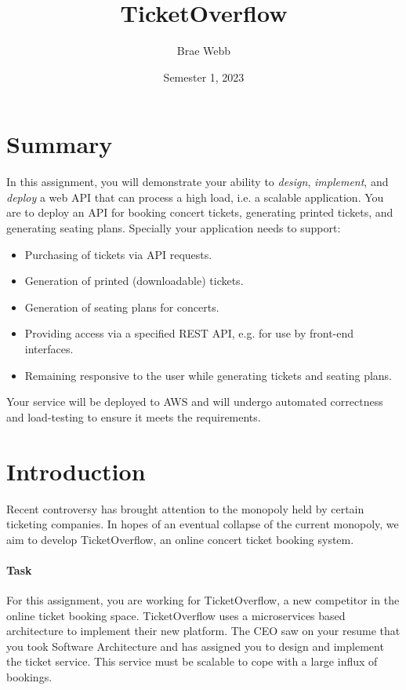 \documentclass{csse4400}
\title{TicketOverflow}
\author{Brae Webb}
\date{Semester 1, 2023}
\begin{document}
\maketitle

\section*{Summary}
In this assignment, you will demonstrate your ability to \textsl{design},
\textsl{implement}, and \textsl{deploy} a web API that can process a high load,
i.e. a scalable application.
You are to deploy an API for booking concert tickets,
generating printed tickets, and generating seating plans.
Specially your application needs to support:
\begin{itemize}
    \item Purchasing of tickets via API requests.
    \item Generation of printed (downloadable) tickets.
    \item Generation of seating plans for concerts.
    \item Providing access via a specified REST API, e.g. for use by front-end interfaces.
    \item Remaining responsive to the user while generating tickets and seating plans.
\end{itemize}

Your service will be deployed to AWS and will undergo automated correctness and load-testing to ensure it meets the requirements.

\section{Introduction}
Recent controversy has brought attention to the monopoly held by certain ticketing companies.
In hopes of an eventual collapse of the current monopoly,
we aim to develop TicketOverflow,
an online concert ticket booking system.

\paragraph{Task}
For this assignment,
you are working for TicketOverflow,
a new competitor in the online ticket booking space.
TicketOverflow uses a microservices based architecture to implement their new platform.
The CEO saw on your resume that you took Software Architecture and has assigned you to design and implement the ticket service.
This service must be scalable to cope with a large influx of bookings.
\end{document}

